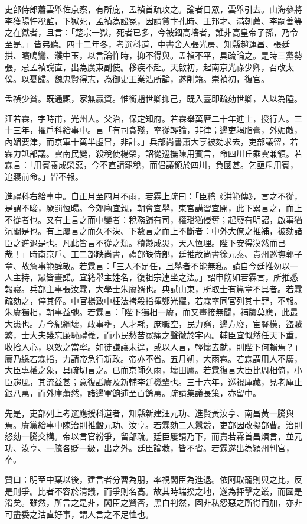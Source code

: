 \begin{pinyinscope}
吏部侍郎蕭雲舉佐京察，有所庇，孟禎首疏攻之。論者日眾，雲舉引去。山海參將李獲陽忤稅監，下獄死，孟禎為訟冤，因請貸卞孔時、王邦才、滿朝薦、李嗣善等之在獄者，且言：「楚宗一獄，死者已多，今被錮高墻者，誰非高皇帝子孫，乃令至是。」皆弗聽。四十二年冬，考選科道，中書舍人張光房、知縣趙運昌、張廷拱、曠鳴鸞、濮中玉，以言論忤時，抑不得與。孟禎不平，具疏論之。是時三黨勢張，忌孟禎讜直，出為廣東副使。移疾不赴。天啟初，起南京光祿少卿，召改太僕。以憂歸。魏忠賢得志，為御史王業浩所論，遂削籍。崇禎初，復官。

孟禎少貧。既通顯，家無贏資。惟銜趙世卿抑己，既入臺即疏劾世卿，人以為隘。

汪若霖，字時甫，光州人。父治，保定知府。若霖舉萬曆二十年進士，授行人。三十三年，擢戶科給事中。言「有司貪殘，率從輕論，非律；邊吏竭脂膏，外媚敵，內媚要津，而京軍十萬半虛冒，非計。」兵部尚書蕭大亨被劾求去，吏部議留，若霖力詆部議。雲南民變，殺稅使楊榮，詔從巡撫陳用賓言，命四川丘乘雲兼領。若霖言：「用賓養成榮惡，今不直請罷稅，而倡議領於四川，負國甚。乞亟斥用賓，追寢前命。」皆不報。

進禮科右給事中。自正月至四月不雨，若霖上疏曰：「臣稽《洪範傳》，言之不從，是謂不晙，厥罰恆暘。今郊廟宜親，朝會宜舉，東宮講習宜開，此下累言之，而上不從者也。又有上言之而中變者：稅務歸有司，權璫猶侵奪；起廢有明詔，啟事猶沉閣是也。有上屢言之而久不決、下數言之而上不斷者：中外大僚之推補，被劾諸臣之進退是也。凡此皆言不從之類。積鬱成災，天人恆理。陛下安得漠然而已哉！」時南京戶、工二部缺尚書，禮部缺侍郎，廷推故尚書徐元泰、貴州巡撫郭子章、故詹事範醇敬。若霖言：「三人不足任，且舉者不能無私。請自今廷推勿以一人主持，眾皆畫諾。宜籍舉主姓名，復祖宗連坐之法。」詔申飭如若霖言，所推悉報寢。兵部主事張汝霖，大學士朱賡婿也。典試山東，所取士有篇章不具者。若霖疏劾之，停其俸。中官楊致中枉法拷殺指揮鄭光擢，若霖率同官列其十罪，不報。朱賡獨相，朝事益弛。若霖言：「陛下獨相一賡，而又畫接無聞，補牘莫應，此最大患也。方今紀綱壞，政事壅，人才耗，庶職空，民力窮，邊方廢，宦豎橫，盜賊繁，士大夫幾忘廉恥禮義，而小民愁苦冤痛之聲徹於宇內。輔臣宜慨然任天下重，收拾人心，以效之當寧。如徒謙讓未遑，或以人言，輕懷去就，則陛下何賴焉？」賡乃緣若霖指，力請帝急行新政。帝亦不省。五月朔，大雨雹。若霖謂用人不廣，大臣專權之象，具疏切言之。已而京師久雨，壞田廬。若霖復言大臣比周相倚，小臣趨風，其流益甚；意復詆賡及新輔李廷機輩也。三十六年，巡視庫藏，見老庫止銀八萬，而外庫蕭然，諸邊軍餉逋至百餘萬。疏請集議長策，亦留中。

先是，吏部列上考選應授科道者，知縣新建汪元功、進賢黃汝亨、南昌黃一騰與焉。賡黨給事中陳治則推轂元功、汝亨。若霖劾二人囂競，吏部因改擬部曹。治則怒劾一騰交構。帝以言官紛爭，留部疏。廷臣屢請乃下，而責若霖首昌煩言，並元功、汝亨、一騰各貶一級，出之外。廷臣論救，皆不省。若霖遂出為潁州判官，卒。

贊曰：明至中葉以後，建言者分曹為朋，率視閣臣為進退。依阿取寵則與之比，反是則爭。比者不容於清議，而爭則名高。故其時端揆之地，遂為抨擊之叢，而國是淆矣。雖然，所言之是非，閣臣之賢否，黑白判然，固非私怨惡之所得而加，亦非可盡委之沽直好事，謂人言之不足恤也。


\end{pinyinscope}